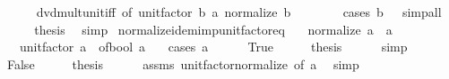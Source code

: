 \begin{isabellebody}
\ \ \ \ \isamarkupfalse%
\ dvd{\isacharunderscore}{\kern0pt}mult{\isacharunderscore}{\kern0pt}unit{\isacharunderscore}{\kern0pt}iff\ {\isacharbrackleft}{\kern0pt}of\ {\isachardoublequoteopen}unit{\isacharunderscore}{\kern0pt}factor\ b{\isachardoublequoteclose}\ a\ {\isachardoublequoteopen}normalize\ b{\isachardoublequoteclose}{\isacharbrackright}{\kern0pt}\isanewline
\ \ \ \ \ \ \isamarkupfalse%
\ {\isacharparenleft}{\kern0pt}cases\ {\isachardoublequoteopen}b\ {\isacharequal}{\kern0pt}\ {}{\isachardoublequoteclose}{\isacharparenright}{\kern0pt}\ simp{\isacharunderscore}{\kern0pt}all\isanewline
\ \ \isamarkupfalse%
\ \isamarkupfalse%
\ {\isacharquery}{\kern0pt}thesis\ \isamarkupfalse%
\ simp\isanewline
{}\isamarkupfalse%
%
\endisatagproof
{\isafoldproof}%
%
\isadelimproof
\isanewline
%
\endisadelimproof
\isanewline
{}\isamarkupfalse%
\ normalize{\isacharunderscore}{\kern0pt}idem{\isacharunderscore}{\kern0pt}imp{\isacharunderscore}{\kern0pt}unit{\isacharunderscore}{\kern0pt}factor{\isacharunderscore}{\kern0pt}eq{\isacharcolon}{\kern0pt}\isanewline
\ \ \ {\isachardoublequoteopen}normalize\ a\ {\isacharequal}{\kern0pt}\ a{\isachardoublequoteclose}\isanewline
\ \ \ {\isachardoublequoteopen}unit{\isacharunderscore}{\kern0pt}factor\ a\ {\isacharequal}{\kern0pt}\ of{\isacharunderscore}{\kern0pt}bool\ {\isacharparenleft}{\kern0pt}a\ {\isasymnoteq}\ {}{\isacharparenright}{\kern0pt}{\isachardoublequoteclose}\isanewline
%
\isadelimproof
%
\endisadelimproof
%
\isatagproof
{}\isamarkupfalse%
\ {\isacharparenleft}{\kern0pt}cases\ {\isachardoublequoteopen}a\ {\isacharequal}{\kern0pt}\ {}{\isachardoublequoteclose}{\isacharparenright}{\kern0pt}\isanewline
\ \ \isamarkupfalse%
\ True\isanewline
\ \ \isamarkupfalse%
\ \isamarkupfalse%
\ {\isacharquery}{\kern0pt}thesis\isanewline
\ \ \ \ \isamarkupfalse%
\ simp\isanewline
{}\isamarkupfalse%
\isanewline
\ \ \isamarkupfalse%
\ False\isanewline
\ \ \isamarkupfalse%
\ \isamarkupfalse%
\ {\isacharquery}{\kern0pt}thesis\isanewline
\ \ \ \ \isamarkupfalse%
\ assms\ unit{\isacharunderscore}{\kern0pt}factor{\isacharunderscore}{\kern0pt}normalize\ {\isacharbrackleft}{\kern0pt}of\ a{\isacharbrackright}{\kern0pt}\ \isamarkupfalse%
\ simp\isanewline
{}\isamarkupfalse%

\end{isabellebody}
